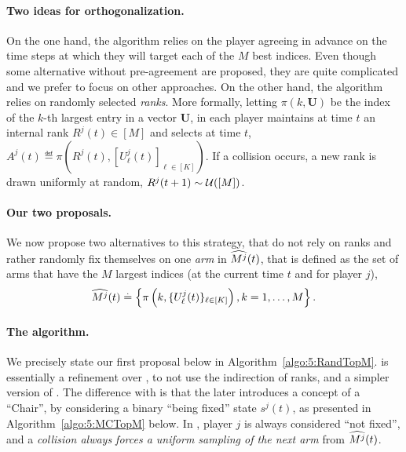 \paragraph{Two ideas for orthogonalization.}
\label{par:5:twoIdeasOrthogonalization}
%
On the one hand, the \TDFS{} algorithm \citep{Zhao10} relies on the player agreeing in advance on the time steps at which they will target each of the $M$ best indices.
Even though some alternative without pre-agreement are proposed, they are quite complicated and we prefer to focus on other approaches.
%
On the other hand, the \rhoRand{} algorithm \citep{Anandkumar11} relies on randomly selected \emph{ranks}. %
%
More formally, letting $\pi(k,\mathbf{U})$ be the index of the $k$-th largest entry in a vector $\mathbf{U}$,
in \rhoRand{} each player maintains at time $t$ an internal rank $R^j(t)\in[M]$
and selects at time $t$,
$A^j(t) \eqdef \pi\left(R^j(t), [U^j_\ell(t)]_{\ell\in[K]}\right)$.
If a collision occurs, a new rank is drawn uniformly at random, $R^j(t+1) \sim \mathcal{U}([M])$.


\paragraph{Our two proposals.}
We now propose two alternatives to this strategy, that do not rely on ranks and rather randomly fix themselves on one \emph{arm} in $\widehat{M^j}(t)$, that is defined as the set of arms that have the $M$ largest indices (at the current time $t$ and for player $j$),
\begin{equation}
  \widehat{M^j}(t) \overset{.}{=} \left\{ \pi\left(k, \{U^j_\ell(t)\}_{\ell\in[K]}\right), k=1,\dots,M\right\}.
\end{equation}

\paragraph{The \RandTopM{} algorithm.}
%
We precisely state our first proposal below in Algorithm~\ref{algo:5:RandTopM}.
%
\RandTopM{} is essentially a refinement over \RhoRand, to not use the indirection of ranks, and a simpler version of \MCTopM.
The difference with \MCTopM{} is that the later introduces a concept of a ``Chair'', by considering a binary ``being fixed'' state $s^j(t)$, as presented in Algorithm~\ref{algo:5:MCTopM} below.
%
In \RandTopM{}, player $j$ is always considered ``not fixed'',
and a \emph{collision always forces a uniform sampling of the next arm} from $\widehat{M^j}(t)$.

